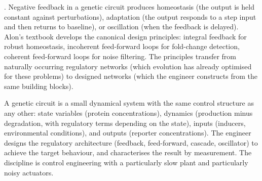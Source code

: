 . Negative feedback in a
genetic circuit produces homeostasis (the output is held constant
against perturbations), adaptation (the output responds to a step
input and then returns to baseline), or oscillation (when the
feedback is delayed). Alon's textbook
\cite[chs.~3--5]{text:v6c09-alon-systems-biology-2019} develops the canonical
design principles: integral feedback for robust homeostasis,
incoherent feed-forward loops for fold-change detection, coherent
feed-forward loops for noise filtering. The principles transfer
from naturally occurring regulatory networks (which evolution has
already optimised for these problems) to designed networks (which
the engineer constructs from the same building blocks).

\begin{archetype}
A genetic circuit is a small dynamical system with the same control
structure as any other: state variables (protein concentrations),
dynamics (production minus degradation, with regulatory terms
depending on the state), inputs (inducers, environmental
conditions), and outputs (reporter concentrations). The engineer
designs the regulatory architecture (feedback, feed-forward, cascade,
oscillator) to achieve the target behaviour, and characterises the
result by measurement. The discipline is control engineering with a
particularly slow plant and particularly noisy actuators.
\end{archetype}

